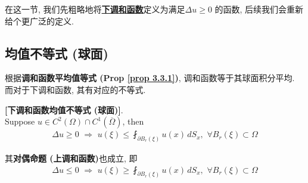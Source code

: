 	\vspace{1em}
	
	\hspace{-1.95em}在这一节, 我们先粗略地将\underline{\textbf{下调和函数}}定义为满足$\Delta u \geq 0$ 的函数, 后续我们会重新给个更广泛的定义. 
	
\subsection{均值不等式 (球面)}
	根据\textbf{调和函数平均值等式 (Prop \ref{prop 3.3.1})}, 调和函数等于其球面积分平均. 而对于下调和函数, 其有对应的不等式. 
	
	\vspace{1em}
	
	\begin{proposition}\label{prop 3.4.1}
		\textbf{[下调和函数均值不等式 (球面)]}. \\
		Suppose $u \in C^2(\Omega) \cap C^1 \left( \overline{\Omega} \right)$, then
		\begin{align*}
			\Delta u \geq 0 \,\, \Rightarrow \,\, u(\xi) \leq \fint_{\partial B_{r}(\xi)} u(x) \, dS_x , \,\, \forall B_{r}(\xi) \subset \Omega
		\end{align*}
		
		\vspace{2em}
		
		\begin{rmk}
			其\textbf{对偶命题 (上调和函数)}也成立, 即
			\begin{align*}
				\Delta u \leq 0 \,\, \Rightarrow \,\, u(\xi) \geq \fint_{\partial B_{r}(\xi)} u(x) \, dS_x , \,\, \forall B_{r}(\xi) \subset \Omega
			\end{align*}
		\end{rmk}
		
		\vspace{4em}
		

\end{proposition}
